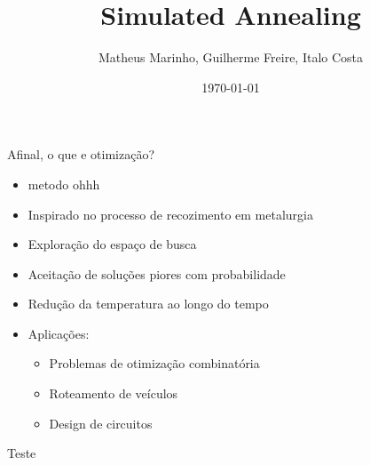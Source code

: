 \documentclass{beamer}
\title{Simulated Annealing}
\author{Matheus Marinho, Guilherme Freire, Italo Costa}
\date{\today}
\begin{document}
\frame{\titlepage}

\begin{frame}{Afinal, o que e otimização?}
    \begin{itemize}
        \item metodo ohhh
        \item Inspirado no processo de recozimento em metalurgia
        \item Exploração do espaço de busca
        \item Aceitação de soluções piores com probabilidade
        \item Redução da temperatura ao longo do tempo
        \item Aplicações:
            \begin{itemize}
                \item Problemas de otimização combinatória
                \item Roteamento de veículos
                \item Design de circuitos
            \end{itemize}
    \end{itemize}
\end{frame}

\begin{frame}
    Teste
\end{frame}
\end{document}

